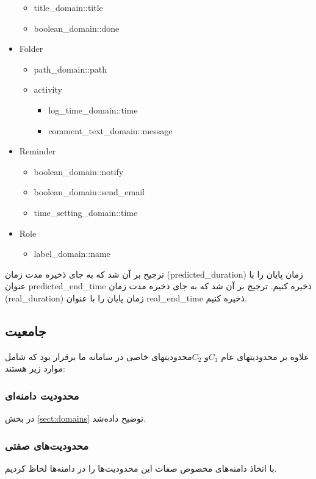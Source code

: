 \documentclass{article}
\begin{document}
\begin{itemize}
	\begin{itemize}
	\item title\_domain::title
	\item boolean\_domain::done
	\end{itemize}
	
\item Folder
	\begin{itemize}
	\item path\_domain::path
	\item activity	
		\begin{itemize}
		\item log\_time\_domain::time
		\item comment\_text\_domain::message
		\end{itemize}
	\end{itemize}
\item Reminder
	\begin{itemize}
	\item boolean\_domain::notify
	\item boolean\_domain::send\_email
	\item time\_setting\_domain::time
	\end{itemize}
\item Role
	\begin{itemize}
	\item label\_domain::name
	\end{itemize}
\end{itemize}
\persian
ترجیح بر آن شد که به جای ذخیره مدت زمان (predicted\_duration) زمان پایان را با عنوان predicted\_end\_time ذخیره کنیم. 
ترجیح بر آن شد که به جای ذخیره مدت زمان (real\_duration) زمان پایان را با عنوان real\_end\_time ذخیره کنیم. 
\subsection*{جامعیت}
علاوه بر محدودیتهای عام $C_1 $و $ C_2$محدودیتهای خاصی در سامانه ما برقرار بود که شامل موارد زیر هستند:
\subsubsection*{محدودیت دامنه‌ای}
در بخش 
\ref{sect:domains}
توضیح داده‌شد.
\subsubsection*{محدودیت‌های صفتی}
با اتخاذ دامنه‌های مخصوص صفات این محدودیت‌ها را در دامنه‌ها لحاظ کردیم.
\end{document}
